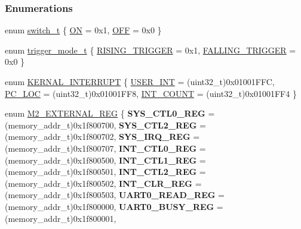 \subsubsection*{Enumerations}
\begin{DoxyCompactItemize}
\item 
enum \mbox{\hyperlink{a00020_ab43e533f3793920486fb81c580f71564}{switch\+\_\+t}} \{ \mbox{\hyperlink{a00020_ab43e533f3793920486fb81c580f71564a977d478dacaae531f95695750d1e9d03}{ON}} = 0x1, 
\mbox{\hyperlink{a00020_ab43e533f3793920486fb81c580f71564aac132f2982b98bcaa3445e535a03ff75}{O\+FF}} = 0x0
 \}
\item 
enum \mbox{\hyperlink{a00020_a6d33f21be3f0c5cf91c5d638e8aca086}{trigger\+\_\+mode\+\_\+t}} \{ \mbox{\hyperlink{a00020_a6d33f21be3f0c5cf91c5d638e8aca086a60a109ab1ab372f4e3935064a3f0a26c}{R\+I\+S\+I\+N\+G\+\_\+\+T\+R\+I\+G\+G\+ER}} = 0x1, 
\mbox{\hyperlink{a00020_a6d33f21be3f0c5cf91c5d638e8aca086a75134708fc2093222ca5a56acefc5d3f}{F\+A\+L\+L\+I\+N\+G\+\_\+\+T\+R\+I\+G\+G\+ER}} = 0x0
 \}
\item 
enum \mbox{\hyperlink{a00020_a4ecccde27f29cedbe9bc6a22e3aad16f}{K\+E\+R\+N\+A\+L\+\_\+\+I\+N\+T\+E\+R\+R\+U\+PT}} \{ \mbox{\hyperlink{a00020_a4ecccde27f29cedbe9bc6a22e3aad16fa2c882d4b03fdd083b40f2807ea7c0bf2}{U\+S\+E\+R\+\_\+\+I\+NT}} = (uint32\+\_\+t)0x01001\+F\+FC, 
\mbox{\hyperlink{a00020_a4ecccde27f29cedbe9bc6a22e3aad16fa2a5bd1194e8dba9ee7ed1d1039942739}{P\+C\+\_\+\+L\+OC}} = (uint32\+\_\+t)0x01001\+F\+F8, 
\mbox{\hyperlink{a00020_a4ecccde27f29cedbe9bc6a22e3aad16fa529ec3035e124aebce1fd8b0a0b7c408}{I\+N\+T\+\_\+\+C\+O\+U\+NT}} = (uint32\+\_\+t)0x01001\+F\+F4
 \}
\item 
enum \mbox{\hyperlink{a00020_adadaa0ab1ebbd7ba9b70dfd24c3ed44d}{M2\+\_\+\+E\+X\+T\+E\+R\+N\+A\+L\+\_\+\+R\+EG}} \{ \newline
{\bfseries S\+Y\+S\+\_\+\+C\+T\+L0\+\_\+\+R\+EG} = (memory\+\_\+addr\+\_\+t)0x1f800700, 
{\bfseries S\+Y\+S\+\_\+\+C\+T\+L2\+\_\+\+R\+EG} = (memory\+\_\+addr\+\_\+t)0x1f800702, 
{\bfseries S\+Y\+S\+\_\+\+I\+R\+Q\+\_\+\+R\+EG} = (memory\+\_\+addr\+\_\+t)0x1f800707, 
{\bfseries I\+N\+T\+\_\+\+C\+T\+L0\+\_\+\+R\+EG} = (memory\+\_\+addr\+\_\+t)0x1f800500, 
{\bfseries I\+N\+T\+\_\+\+C\+T\+L1\+\_\+\+R\+EG} = (memory\+\_\+addr\+\_\+t)0x1f800501, 
{\bfseries I\+N\+T\+\_\+\+C\+T\+L2\+\_\+\+R\+EG} = (memory\+\_\+addr\+\_\+t)0x1f800502, 
{\bfseries I\+N\+T\+\_\+\+C\+L\+R\+\_\+\+R\+EG} = (memory\+\_\+addr\+\_\+t)0x1f800503, 
{\bfseries U\+A\+R\+T0\+\_\+\+R\+E\+A\+D\+\_\+\+R\+EG} = (memory\+\_\+addr\+\_\+t)0x1f800000, 
{\bfseries U\+A\+R\+T0\+\_\+\+B\+U\+S\+Y\+\_\+\+R\+EG} = (memory\+\_\+addr\+\_\+t)0x1f800001, 

\end{DoxyCompactItemize}
